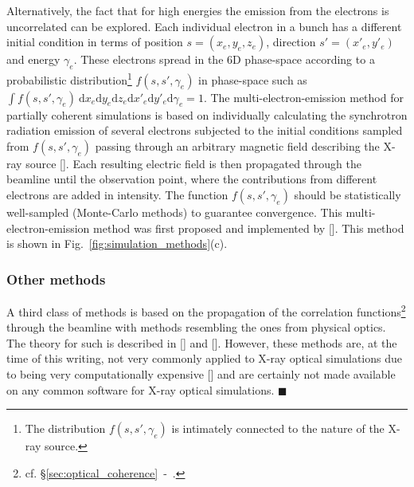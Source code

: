 \begin{refsection}
Alternatively, the fact that for high energies the emission from the electrons is uncorrelated can be explored. Each individual electron in a bunch has a different initial condition in terms of position $s=(x_e,y_e,z_e)$, direction $s'=(x'_e,y'_e)$ and energy $\gamma_e$. These electrons spread in the 6D phase-space according to a probabilistic distribution\footnote{The distribution $f(s,s',\gamma_e)$ is intimately connected to the nature of the X-ray source.} $f(s,s',\gamma_e)$ in phase-space such as $\int f(s,s',\gamma_e)~\mathrm{d}x_e\mathrm{d}y_e\mathrm{d}z_e\mathrm{d}x'_e\mathrm{d}y'_e\mathrm{d}\gamma_e=1$. The multi-electron-emission method for partially coherent simulations is based on individually calculating the synchrotron radiation emission of several electrons subjected to the initial conditions sampled from $f(s,s',\gamma_e)$ passing through an arbitrary magnetic field describing the X-ray source [\cite{Chubar1995}]. Each resulting electric field is then propagated through the beamline until the observation point, where the contributions from different electrons are added in intensity. The function $f(s,s',\gamma_e)$ should be statistically well-sampled (Monte-Carlo methods) to guarantee convergence. This multi-electron-emission method was first proposed and implemented by [\cite{Chubar2011}]. This method is shown in Fig.~\ref{fig:simulation_methods}(c).

\subsubsection*{Other methods}

A third class of methods is based on the propagation of the correlation functions\footnote{cf. §\ref{sec:optical_coherence}~-~\textit{}.} through the beamline with methods resembling the ones from physical optics. The theory for such is described in [\cite{Parrent1959}] and [\cite[\textit{§4.4}]{Mandel1995}]. However, these methods are, at the time of this writing, not very commonly applied to X-ray optical simulations due to being very computationally expensive [\cite{Meng2015, Meng2017, Ren2019}] and are certainly not made available on any common software for X-ray optical simulations. $\blacksquare$

\printbibliography[heading=subbibliography]
\end{refsection}

